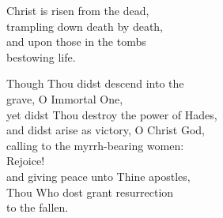 \documentclass{article}
\begin{document}
%
Christ is risen from the dead, \\
trampling down death by death, \\
and upon those in the tombs \\
    \cont bestowing life.

Though Thou didst descend into the \\
        \cont grave, O Immortal One, \\
yet didst Thou destroy the power of Hades, \\
and didst arise as victory, O Christ God, \\
calling to the myrrh-bearing women: \\
        \cont Rejoice! \\
and giving peace unto Thine apostles, \\
Thou Who dost grant resurrection \\
        \cont to the fallen.


\vfill
\end{document}
